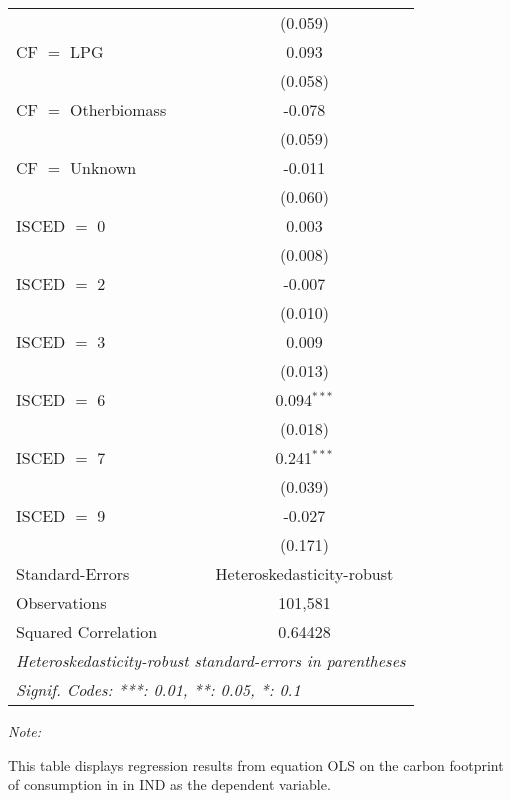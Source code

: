 \begin{table}[htbp!]
\begin{adjustbox}{width = 1\textwidth, max height = 0.95\textheight, center}
\begin{threeparttable}[b]
\begin{tabular}{lc}
                                & (0.059)\\   
            CF $=$ LPG          & 0.093\\   
                                & (0.058)\\   
            CF $=$ Otherbiomass & -0.078\\   
                                & (0.059)\\   
            CF $=$ Unknown      & -0.011\\   
                                & (0.060)\\   
            ISCED $=$ 0         & 0.003\\   
                                & (0.008)\\   
            ISCED $=$ 2         & -0.007\\   
                                & (0.010)\\   
            ISCED $=$ 3         & 0.009\\   
                                & (0.013)\\   
            ISCED $=$ 6         & 0.094$^{***}$\\   
                                & (0.018)\\   
            ISCED $=$ 7         & 0.241$^{***}$\\   
                                & (0.039)\\   
            ISCED $=$ 9         & -0.027\\   
                                & (0.171)\\   
            \midrule 
            Standard-Errors     & Heteroskedasticity-robust \\   
            Observations        & 101,581\\  
            Squared Correlation & 0.64428\\  
            \midrule \midrule
            \multicolumn{2}{l}{\emph{Heteroskedasticity-robust standard-errors in parentheses}}\\
            \multicolumn{2}{l}{\emph{Signif. Codes: ***: 0.01, **: 0.05, *: 0.1}}\\
         \end{tabular}
         
         \begin{tablenotes}\item \medskip \textit{Note:}
            \item This table displays regression results from equation OLS on the carbon footprint of consumption in  in IND as the dependent variable.  
         \end{tablenotes}
      \end{threeparttable}
   \end{adjustbox}
\end{table}


